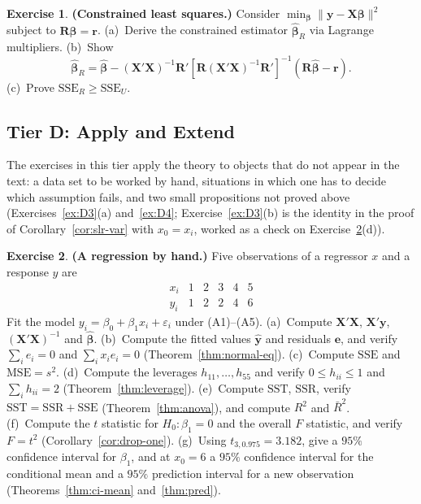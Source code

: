 \documentclass[14pt]{extarticle}
\theoremstyle{plain}
\theoremstyle{definition}
\newtheorem{exercise}{Exercise}
\newcommand{\extier}{}
\newcommand{\exercisetier}[1]{\renewcommand{\extier}{#1}\setcounter{exercise}{0}}
\theoremstyle{remark}
\newcommand{\SST}{\mathrm{SST}}
\newcommand{\SSR}{\mathrm{SSR}}
\newcommand{\SSE}{\mathrm{SSE}}
\newcommand{\MSE}{\mathrm{MSE}}
\newcommand{\bX}{\mathbf{X}}
\newcommand{\by}{\mathbf{y}}
\def\bb{\boldsymbol{\beta}}
\newcommand{\bR}{\mathbf{R}}
\newcommand{\br}{\mathbf{r}}
\begin{document}
\begin{exercise}\label{ex:C4}
\textbf{(Constrained least squares.)} Consider $\min_{\bb}\|\by - \bX\bb\|^2$ subject to $\bR\bb = \br$. (a)~Derive the constrained estimator $\hat{\bb}_R$ via Lagrange multipliers. (b)~Show
\[
\hat{\bb}_R = \hat{\bb} - (\bX'\bX)^{-1}\bR'[\bR(\bX'\bX)^{-1}\bR']^{-1}(\bR\hat{\bb} - \br).
\]
(c)~Prove $\SSE_R \geqslant \SSE_U$.
\end{exercise}

\exercisetier{D}
\subsection*{Tier D: Apply and Extend}

The exercises in this tier apply the theory to objects that do not appear in the text: a data set to be worked by hand, situations in which one has to decide which assumption fails, and two small propositions not proved above (Exercises~\ref{ex:D3}(a) and~\ref{ex:D4}; Exercise~\ref{ex:D3}(b) is the identity in the proof of Corollary~\ref{cor:slr-var} with $x_0 = x_i$, worked as a check on Exercise~\ref{ex:D1}(d)).

\begin{exercise}\label{ex:D1}
\textbf{(A regression by hand.)} Five observations of a regressor $x$ and a response $y$ are
\[
\begin{array}{c|ccccc}
x_i & 1 & 2 & 3 & 4 & 5\\ \hline
y_i & 1 & 2 & 2 & 4 & 6
\end{array}
\]
Fit the model $y_i = \beta_0 + \beta_1 x_i + \varepsilon_i$ under (A1)--(A5). (a)~Compute $\bX'\bX$, $\bX'\by$, $(\bX'\bX)^{-1}$ and $\hat{\bb}$. (b)~Compute the fitted values $\hat{\by}$ and residuals $\mathbf{e}$, and verify $\sum_i e_i = 0$ and $\sum_i x_i e_i = 0$ (Theorem~\ref{thm:normal-eq}). (c)~Compute $\SSE$ and $\MSE = s^2$. (d)~Compute the leverages $h_{11}, \ldots, h_{55}$ and verify $0 \leqslant h_{ii} \leqslant 1$ and $\sum_i h_{ii} = 2$ (Theorem~\ref{thm:leverage}). (e)~Compute $\SST$, $\SSR$, verify $\SST = \SSR + \SSE$ (Theorem~\ref{thm:anova}), and compute $R^2$ and $\bar{R}^2$. (f)~Compute the $t$ statistic for $H_0\colon \beta_1 = 0$ and the overall $F$ statistic, and verify $F = t^2$ (Corollary~\ref{cor:drop-one}). (g)~Using $t_{3,0.975} = 3.182$, give a $95\%$ confidence interval for $\beta_1$, and at $x_0 = 6$ a $95\%$ confidence interval for the conditional mean and a $95\%$ prediction interval for a new observation (Theorems~\ref{thm:ci-mean} and~\ref{thm:pred}).
\end{exercise}
\end{document}
